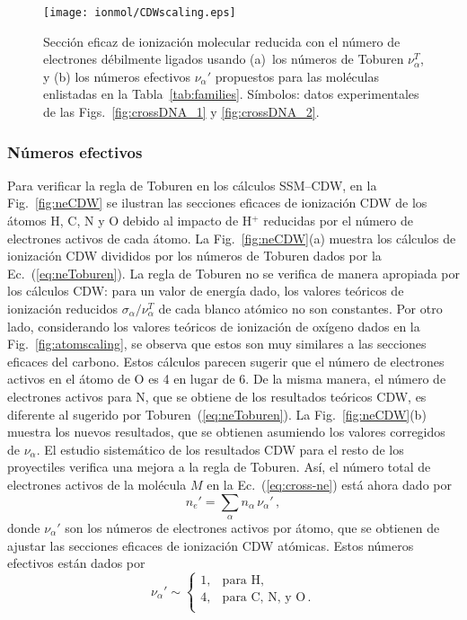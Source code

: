 \begin{figure}[t]
\centering
\texttt{[image: ionmol/CDWscaling.eps]}
\caption[Sección eficaz de ionización molecular reducida por $n_e$.]
{Sección eficaz de ionización molecular reducida con el número de 
electrones débilmente ligados usando 
(a)~los números de Toburen $\nu_{\alpha}^T$, y 
(b) los números efectivos $\nu_{\alpha}'$ propuestos para las 
moléculas enlistadas en la Tabla~\ref{tab:families}. 
Símbolos: datos experimentales de las Figs.~\ref{fig:crossDNA_1} y 
\ref{fig:crossDNA_2}.}
\label{fig:newscaling}
\end{figure}

\subsubsection{Números efectivos}
\label{subsec:CDW}

Para verificar la regla de Toburen en los cálculos SSM--CDW, 
en la Fig.~\ref{fig:neCDW} se ilustran las secciones eficaces de 
ionización CDW de los átomos H, C, N y O debido al impacto de H$^+$ 
reducidas por el número de electrones activos de cada átomo. La 
Fig.~\ref{fig:neCDW}(a) muestra los cálculos de ionización CDW divididos 
por los números de Toburen dados por la Ec.~(\ref{eq:neToburen}). La 
regla de Toburen no se verifica de manera apropiada por los cálculos 
CDW: para un valor de energía dado, los valores teóricos de ionización 
reducidos $\sigma_{\alpha}/\nu_{\alpha}^T$ de cada blanco atómico no son 
constantes. Por otro lado, considerando los valores teóricos de 
ionización de oxígeno dados en la Fig.~\ref{fig:atomscaling}, se observa 
que estos son muy similares a las secciones eficaces del carbono. Estos 
cálculos parecen sugerir que el número de electrones activos en el 
átomo de O es 4 en lugar de 6. De la misma manera, el número de 
electrones activos para N, que se obtiene de los resultados teóricos 
CDW, es diferente al sugerido por Toburen~(\ref{eq:neToburen}). 
La Fig.~\ref{fig:neCDW}(b) muestra los nuevos resultados, que se 
obtienen asumiendo los valores corregidos de $\nu_{\alpha}$. El estudio 
sistemático de los resultados CDW para el resto de los proyectiles 
verifica una mejora a la regla de Toburen. Así, el número total de 
electrones activos de la molécula $M$ en la Ec.~(\ref{eq:cross-ne}) está 
ahora dado por 
\begin{equation}
n_e'=\sum_{\alpha}n_{\alpha}\,\nu_{\alpha}'\,,
\label{eq:neprima}
\end{equation}
donde $\nu_{\alpha}'$ son los números de electrones activos 
por átomo, que se obtienen de ajustar las secciones eficaces de 
ionización CDW atómicas. Estos números efectivos están dados por
\begin{equation}
\nu_{\alpha }' \sim\left\{ 
\begin{array}{ll}
1, & \text{para H,} \\
4, & \text{para C, N, y O}\,. \\ 
\end{array}
\right. 
\label{eq:neCDW}
\end{equation}

